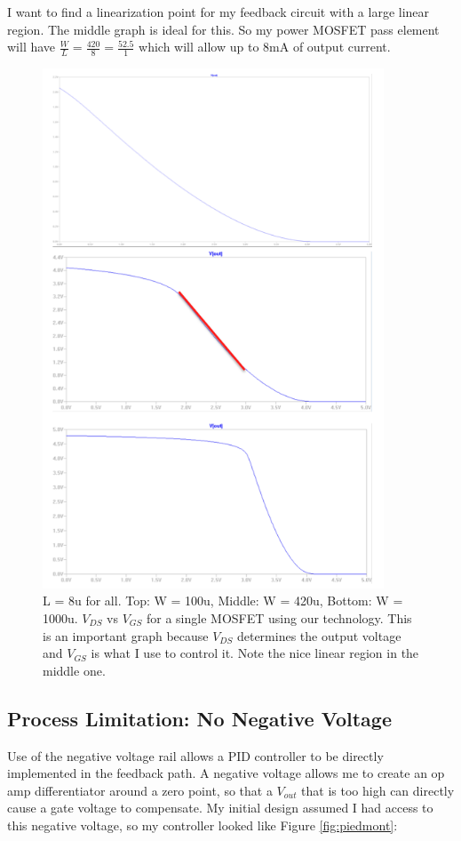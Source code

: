 \documentclass[10pt]{amsart}
\begin{document}
I want to find a linearization point for my feedback circuit with a large linear region. The middle graph is ideal for this. So my power MOSFET pass element will have $\frac{W}{L}=\frac{420}{8}=\frac{52.5}{1}$ which will allow up to 8mA of output current.

\begin{figure}[h]
	\begin{center}
		\includegraphics[width=4.0in]{Media/WL.png}
	\end{center}
	\caption{L = 8u for all. Top: W = 100u, Middle: W = 420u, Bottom: W = 1000u. $V_{DS}$ vs $V_{GS}$ for a single MOSFET using our technology. This is an important graph because $V_{DS}$ determines the output voltage and $V_{GS}$ is what I use to control it. Note the nice linear region in the middle one.}
	\label{fig:wl}
\end{figure}


\subsection{Process Limitation: No Negative Voltage}

Use of the negative voltage rail allows a PID controller to be directly implemented in the feedback path. A negative voltage allows me to create an op amp differentiator around a zero point, so that a $V_{out}$ that is too high can directly cause a gate voltage to compensate. My initial design assumed I had access to this negative voltage, so my controller looked like Figure \ref{fig:piedmont}: \\
\end{document}
